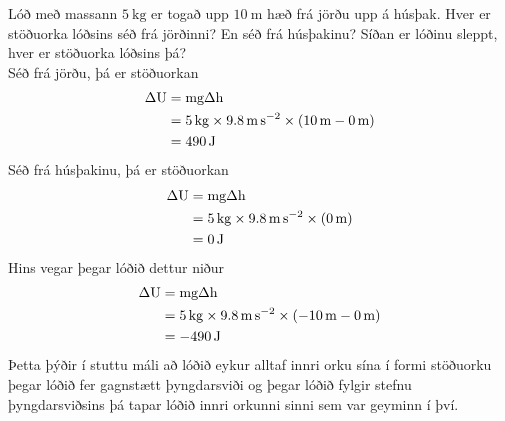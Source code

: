 \begin{formalexample}
Lóð með massann $\SI{5}{\kg}$ er togað upp $\SI{10}{\m}$ hæð frá jörðu upp á húsþak.
Hver er stöðuorka lóðsins séð frá jörðinni? En séð frá húsþakinu? Síðan er lóðinu
sleppt, hver er stöðuorka lóðsins þá?
\\[4 ex]
Séð frá jörðu, þá er stöðuorkan
\begin{align*}
	\Delta \upotentialu &= \umass \uacceleg \Delta\ulengthh \\
		&= \SI{5}{\kg} \times \SI{9.8}{\m\per\s\squared} 
			\times ( \SI{10}{\m} - \SI{0}{\m} ) \\
		&= \SI{490}{\J}
\end{align*}
Séð frá húsþakinu, þá er stöðuorkan
\begin{align*}
	\Delta \upotentialu &= \umass \uacceleg \Delta\ulengthh \\
		&= \SI{5}{\kg} \times \SI{9.8}{\m\per\s\squared} 
			\times (\SI{0}{\m}) \\
		&= \SI{0}{\J}
\end{align*}
Hins vegar þegar lóðið dettur niður
\begin{align*}
	\Delta \upotentialu &= \umass \uacceleg \Delta\ulengthh \\
		&= \SI{5}{\kg} \times \SI{9.8}{\m\per\s\squared}
			\times (-\SI{10}{\m} - \SI{0}{\m} ) \\
		&= -\SI{490}{\J}
\end{align*}
Þetta þýðir í stuttu máli að lóðið eykur alltaf innri orku sína í formi stöðuorku
þegar lóðið fer gagnstætt þyngdarsviði og þegar lóðið fylgir stefnu þyngdarsviðsins
þá tapar lóðið innri orkunni sinni sem var geyminn í því.
\end{formalexample}

